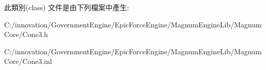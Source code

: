 此類別(class) 文件是由下列檔案中產生\+:\begin{DoxyCompactItemize}
\item 
C\+:/innovation/\+Government\+Engine/\+Epic\+Force\+Engine/\+Magnum\+Engine\+Lib/\+Magnum\+Core/Cone3.\+h\item 
C\+:/innovation/\+Government\+Engine/\+Epic\+Force\+Engine/\+Magnum\+Engine\+Lib/\+Magnum\+Core/Cone3.\+inl\end{DoxyCompactItemize}
